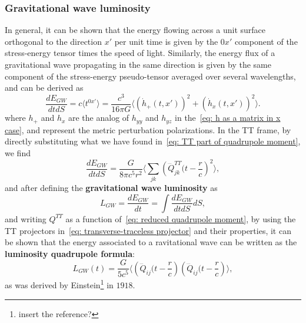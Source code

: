 \subsubsection{Gravitational wave luminosity}
In general, it can be shown that the energy flowing across a unit surface orthogonal to the direction $x'$ per unit time is given by the $0x'$ component of the stress-energy tensor times the speed of light.
Similarly, the energy flux of a gravitational wave propagating in the same direction is given by the same component of the stress-energy pseudo-tensor averaged over several wavelengths, and can be derived as
\[
    \frac{dE_{GW}}{dtdS} = c\langle t^{0x'}\rangle = \frac{c^3}{16\pi G}\langle (\dot{h}_+(t,x'))^2 + (\dot{h}_x(t,x'))^2 \rangle.
\]
where $h_+$ and $h_x$ are the analog of $h_{yy}$ and $h_{yz}$ in the~\eqref{eq: h as a matrix in x case}, and represent the metric perturbation polarizations.
In the TT frame, by directly substituting what we have found in~\eqref{eq: TT part of quadrupole moment}, we find 
\[
\frac{dE_{GW}}{dtdS} = \frac{G}{8\pi c^5 r^2}\Big\langle \sum_{jk}\left( \dddot{Q}_{jk}^{TT}(t-\frac{r}{c} \right)^2 \Big\rangle,
\]
and after defining the \textbf{gravitational wave luminosity} as
\[
    L_{GW} = \frac{dE_{GW}}{dt} = \int \frac{dE_{GW}}{dtdS}dS,
\]
and writing $Q^{TT}$ as a function of~\eqref{eq: reduced quadrupole moment}, by using the TT projectors in~\eqref{eq: transverse-traceless projector} and their properties, it can be shown that the energy associated to a ravitational wave can be written as the \textbf{luminosity quadrupole formula}:
\begin{equation}
    L_{GW}(t) = \frac{G}{5c^5}\Big\langle \left(\dddot{Q}_{ij}(t- \frac{r}{c}\right) \left(\dddot{Q}_{ij}(t-\frac{r}{c}\right) \Big\rangle,
    \label{eq: luminosity quadrupole formula}
\end{equation}
as was derived by Einstein\footnote{insert the reference?} in $1918$.

